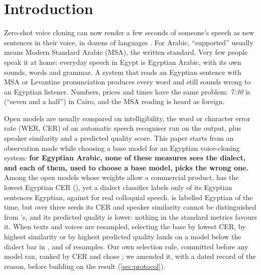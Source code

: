 \section{Introduction}\label{sec:intro}

Zero-shot voice cloning can now render a few seconds of someone's speech as new sentences in their voice, in dozens of
languages \citep{chen2025valle,ju2024naturalspeech3,chen2025f5tts,du2024cosyvoice2,zhou2026voxcpm2}. For Arabic, ``supported''
usually means Modern Standard Arabic (MSA), the written standard. Very few people speak it at home: everyday
speech in Egypt is Egyptian Arabic, with its own sounds, words and grammar. A system that reads an Egyptian
sentence with MSA or Levantine pronunciation produces every word and still sounds wrong to an Egyptian listener.
Numbers, prices and times have the same problem: \emph{7:30} is  (``seven and a half'') in
Cairo, and the MSA reading is heard as foreign.

Open models are usually compared on intelligibility, the word or character error rate (WER, CER) of an automatic
speech recogniser run on the output, plus speaker similarity and a predicted quality score. This paper starts from
an observation made while choosing a base model for an Egyptian voice-cloning system: \textbf{for Egyptian Arabic,
none of these measures sees the dialect, and each of them, used to choose a base model, picks the wrong one.} Among
the open models whose weights allow a commercial product, \cbthree has the lowest Egyptian CER (),
yet a dialect classifier labels only  of its Egyptian sentences Egyptian, against
 for real colloquial speech. \vox is labelled Egyptian  of the time, but over
three seeds its CER and speaker similarity cannot be distinguished from \cbthree's, and its predicted quality is lower:
nothing in the standard metrics favours it. When texts and voices are resampled, selecting the base by lowest CER, by
highest similarity or by highest predicted quality lands on a model below the dialect bar in
,  and  of resamples. Our own
selection rule, committed before any model ran, ranked by CER and chose \cbthree; we amended it, with a dated record of the
reason, before building on the result (\cref{sec:protocol}).

